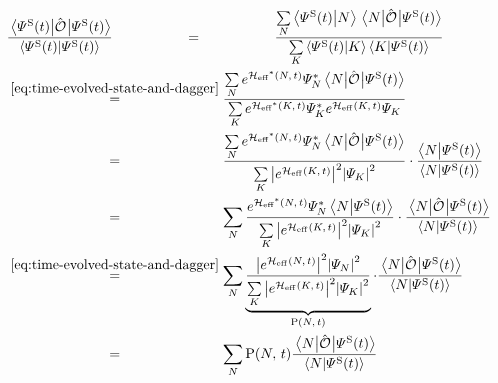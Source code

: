 \begin{equation}
    \label{eq:expectation-value}
    \begin{split}
        &\frac{\bracketHelper{\psiOfT[\schroedingerPicture]}{\ObservableOp}{\psiOfT[\schroedingerPicture]}}{\braketHelper{\psiOfT[\schroedingerPicture]}{\psiOfT[\schroedingerPicture]}}
        \stackrel{\phantom{\ref{eq:time-evolution-target}}}{=} 
        \frac{
            \lsum[N] \braketHelper{\psiOfT[\schroedingerPicture]}{N} \bracketHelper{N}{\ObservableOp}{\psiOfT[\schroedingerPicture]}
        }{
            \lsum[K] \braketHelper{\psiOfT[\schroedingerPicture]}{K} \braketHelper{K}{\psiOfT[\schroedingerPicture]}
        }\\
        &\stackrel{\ref{eq:time-evolved-state-and-dagger}}{=} 
        \frac{
            \lsum[N] e^{\HeffOftStar} \psiNStar \bracketHelper{N}{\ObservableOp}{\psiOfT[\schroedingerPicture]}
        }{
            \lsum[K] e^{\HeffOftStar[K]} \psiNStar[K] e^{\HeffOft[K]} \psiN[K] 
        }\\
        & \stackrel{\phantom{\ref{eq:time-evolved-state-and-dagger}}}{=} 
        \frac{
            \lsum[N] e^{\HeffOftStar} \psiNStar \bracketHelper{N}{\ObservableOp}{\psiOfT[\schroedingerPicture]}
        }{
            \lsum[K] \absSquare{e^{\HeffOft[K]}} \absSquare{\psiN[K]} 
        } \cdot 
        \frac{\braketHelper{N}{\psiOfT[\schroedingerPicture]}}{\braketHelper{N}{\psiOfT[\schroedingerPicture]}}\\
        & \stackrel{\phantom{\ref{eq:time-evolved-state-and-dagger}}}{=} 
        \lsum[N]
        \frac{
            e^{\HeffOftStar} \psiNStar \braketHelper{N}{\psiOfT[\schroedingerPicture]}
        }{
            \lsum[K] \absSquare{e^{\HeffOft[K]}} \absSquare{\psiN[K]} 
        }  \cdot 
        \frac{\bracketHelper{N}{\ObservableOp}{\psiOfT[\schroedingerPicture]}}{\braketHelper{N}{\psiOfT[\schroedingerPicture]}}\\
        & \stackrel{\ref{eq:time-evolved-state-and-dagger}}{=} 
        \lsum[N]
        \underbrace{\frac{
            \absSquare{e^{\HeffOft}} \absSquare{\psiN} 
        }{
            \lsum[K] \absSquare{e^{\HeffOft[K]}} \absSquare{\psiN[K]} 
        }}_{\probabilityOf{N}{t}} \cdot 
        \frac{\bracketHelper{N}{\ObservableOp}{\psiOfT[\schroedingerPicture]}}{\braketHelper{N}{\psiOfT[\schroedingerPicture]}}\\
        & \stackrel{\phantom{\ref{eq:time-evolved-state-and-dagger}}}{=} \lsum[N]
        \probabilityOf{N}{t}
        \frac{\bracketHelper{N}{\ObservableOp}{\psiOfT[\schroedingerPicture]}}{\braketHelper{N}{\psiOfT[\schroedingerPicture]}}

\end{split}
\end{equation}
